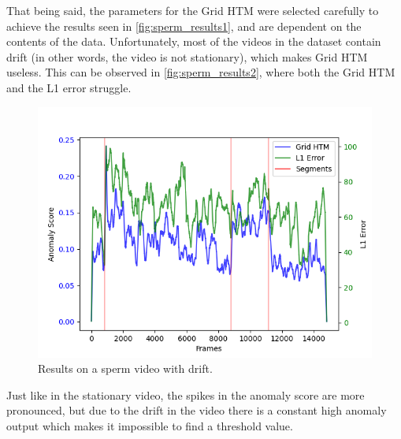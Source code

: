 \par
That being said, the parameters for the Grid HTM were selected carefully to achieve the results seen in \autoref{fig:sperm_results1}, and are dependent on the contents of the data. Unfortunately, most of the videos in the dataset contain drift (in other words, the video is not stationary), which makes Grid HTM useless. This can be observed in \autoref{fig:sperm_results2}, where both the Grid HTM and the L1 error struggle.
\begin{figure}[H]
    \centering
    \includegraphics[width=\textwidth]{resources/experiments/sperm/sperm_result2.png}
    \caption{Results on a sperm video with drift.}
    \label{fig:sperm_results2}
\end{figure}
Just like in the stationary video, the spikes in the anomaly score are more pronounced, but due to the drift in the video there is a constant high anomaly output which makes it impossible to find a threshold value.
